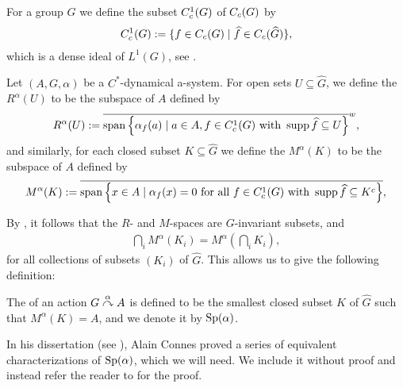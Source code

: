 For a group $G$ we define the subset $C_c^1(G)$ of $C_c(G)$ by
\begin{align*}
	C_c^1(G):= \{ f \in C_c(G) \mid \widehat{f} \in C_c(\widehat{G})\},
\end{align*}
which is a dense ideal of $L^1(G)$, see \cite[Theorem 4.60]{folland2016fourier}.
\begin{definition}
	Let $(A, G, \alpha)$ be a $C^*$-dynamical a-system. For open sets $U \subseteq \hat G$, we define the  $R^\alpha(U)$ to be the subspace of $A$ defined by
	\begin{align*}
		R^\alpha(U) := \overline{ \mathrm{span} \left\{ \alpha_f(a) \mid a \in A, f \in C_c^1(G) \text{ with } \operatorname{supp} \widehat{f} \subseteq U \right\} }^{w},
	\end{align*}
	and similarly, for each closed subset $K \subseteq \hat G$ we define the  $M^\alpha(K)$ to be the subspace of $A$ defined by
	\begin{align*}
		M^\alpha(K) := \overline{\mathrm{span} \left\{ x \in A \mid \alpha_f(x) = 0 \text{ for all } f \in C_c^1(G) \text{ with } \operatorname{supp} \widehat{f} \subseteq K^c \right\}},
	\end{align*}	
\end{definition}
By \cite[Theorem 8.1.4]{pedersenalgauto}, it follows that the $R$- and $M$-spaces are $G$-invariant subsets, and
\begin{align*}
	\bigcap_i M^\alpha(K_i) = M^\alpha\left(\bigcap_i K_i\right),
\end{align*}
for all collections of subsets $(K_i)$ of $\hat G$. This allows us to give the following definition:
\begin{definition}
	The  of an action $G \stackrel{\alpha}{\curvearrowright} A$ is defined to be the smallest closed subset $K$ of $\hat G$ such that $M^\alpha(K) = A$, and we denote it by $\mathrm{Sp}(\alpha)$.
\end{definition}
In his dissertation (see \cite{connesclassification}), Alain Connes proved a series of equivalent characterizations of $\mathrm{Sp}(\alpha)$, which we will need. We include it without proof and instead refer the reader to \cite[Proposition 8.1.9 and 8.1.8]{pedersenalgauto} for the proof.
